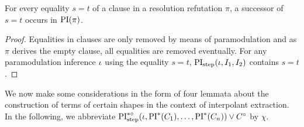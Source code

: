 \documentclass[,%
	draft=false,%
	numbers=noendperiod
	12pt,
	a4paper,
	oneside,%
	openany,
]{memoir}
\newcommand{\inv}{\ensuremath{\chi}}
\begin{document}
\begin{lemma}
	\label{lemma:equalities_all_in_PI}
	For every equality $s=t$ of a clause in a resolution refutation $\pi$,
	a successor of $s=t$ occurs in $\operatorname{PI}(\pi)$.
\end{lemma}
\begin{proof}
	Equalities in clauses are only removed by means of paramodulation and as $\pi$ derives the empty clause, all equalities are removed eventually.
	For any paramodulation inference $\iota$ using the equality $s=t$, $\operatorname{PI}_{\mathrm{step}}(\iota, I_1, I_2)$ contains $s=t$. 
\end{proof}


We now make some considerations in the form of four lemmata about the construction of terms of certain shapes in the context of interpolant extraction.
In the following, we abbreviate $\operatorname{PI}^{*\circ}_{\mathrm{step}}(\iota, \operatorname{PI}^*(C_1), \dots, \operatorname{PI}^*(C_n)) \lor C^\circ$ by $\inv$.
\end{document}
